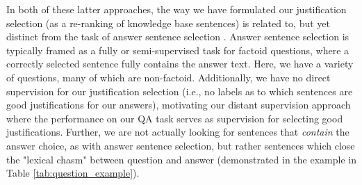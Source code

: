 In both of these latter approaches, the way we have formulated our justification selection (as a re-ranking of knowledge base sentences) is related to, but yet distinct from the task of answer sentence selection \cite[][inter alia]{Wang2010ProbabilisticTM, Severyn:12,Severyn:13a,Severyn:13b,Severyn2015LearningTR,wang2015long}.  Answer sentence selection is typically framed as a fully or semi-supervised task for factoid questions, where a correctly selected sentence fully contains the answer text.
Here, we have a variety of questions, many of which are non-factoid.  Additionally, we have no direct supervision for our justification selection (i.e., no labels as to which sentences are good justifications for our answers), motivating our distant supervision approach where the performance on our QA task serves as supervision for selecting good justifications.  Further, we are not actually looking for sentences that \emph{contain} the answer choice, as with answer sentence selection, but rather sentences which close the "lexical chasm" \cite{Berger:00} between question and answer (demonstrated in the example in Table \ref{tab:question_example}).
